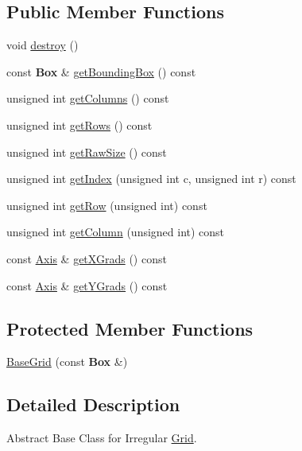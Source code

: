 \subsection*{Public Member Functions}
\begin{DoxyCompactItemize}
\item 
void \hyperlink{classKatabatic_1_1BaseGrid_a3a80b6032f86a56bec74609034b3246f}{destroy} ()
\item 
const \textbf{ Box} \& \hyperlink{classKatabatic_1_1BaseGrid_a4b6cf5a28d88d7ad3e6ddeac28a35a0b}{get\+Bounding\+Box} () const
\item 
unsigned int \hyperlink{classKatabatic_1_1BaseGrid_aeaf0dae788f4c997e6172f9c734e3a91}{get\+Columns} () const
\item 
unsigned int \hyperlink{classKatabatic_1_1BaseGrid_a4bad6abc58473d953258a3230506291a}{get\+Rows} () const
\item 
unsigned int \hyperlink{classKatabatic_1_1BaseGrid_a47cf844f090417180d0bae098133565e}{get\+Raw\+Size} () const
\item 
unsigned int \hyperlink{classKatabatic_1_1BaseGrid_aae84726d9984c1df9905fc97d9b34f28}{get\+Index} (unsigned int c, unsigned int r) const
\item 
unsigned int \hyperlink{classKatabatic_1_1BaseGrid_a8108a276ab72226244d302fb1b59f3f1}{get\+Row} (unsigned int) const
\item 
unsigned int \hyperlink{classKatabatic_1_1BaseGrid_a21a8582c0c89a61d1963262fa053bc1b}{get\+Column} (unsigned int) const
\item 
const \hyperlink{classKatabatic_1_1BaseGrid_1_1Axis}{Axis} \& \hyperlink{classKatabatic_1_1BaseGrid_a1e3eea49f6f58fb8d0b3fa73f5cf3fd7}{get\+X\+Grads} () const
\item 
const \hyperlink{classKatabatic_1_1BaseGrid_1_1Axis}{Axis} \& \hyperlink{classKatabatic_1_1BaseGrid_ab11d8b83eaa19f5fe6fecc63a8bb203e}{get\+Y\+Grads} () const
\end{DoxyCompactItemize}
\subsection*{Protected Member Functions}
\begin{DoxyCompactItemize}
\item 
\hyperlink{classKatabatic_1_1BaseGrid_ac479157e8ac115074615167e8a4a2789}{Base\+Grid} (const \textbf{ Box} \&)
\end{DoxyCompactItemize}


\subsection{Detailed Description}
Abstract Base Class for Irregular \hyperlink{classKatabatic_1_1Grid}{Grid}. 

